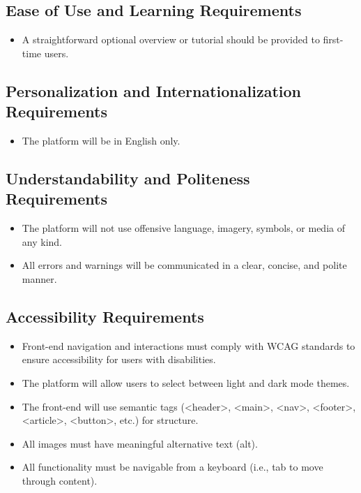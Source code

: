 \documentclass[12pt]{article}
\begin{document}
  \subsection{Ease of Use and Learning Requirements}
    \begin{itemize}
      \item A straightforward optional overview or tutorial should be provided to first-time users.
    \end{itemize}

  \subsection{Personalization and Internationalization Requirements}
    \begin{itemize}
      \item The platform will be in English only.
    \end{itemize}

  \subsection{Understandability and Politeness Requirements}
    \begin{itemize}
      \item The platform will not use offensive language, imagery, symbols, or media of any kind.
      \item All errors and warnings will be communicated in a clear, concise, and polite manner.
    \end{itemize}

  \subsection{Accessibility Requirements}
    \begin{itemize}
      \item Front-end navigation and interactions must comply with WCAG standards to ensure accessibility for users with disabilities.
      \item The platform will allow users to select between light and dark mode themes.
      \item The front-end will use semantic tags (<header>, <main>, <nav>, <footer>, <article>, <button>, etc.) for structure.
      \item All images must have meaningful alternative text (alt).
      \item All functionality must be navigable from a keyboard (i.e., tab to move through content).
    \end{itemize}
\end{document}
